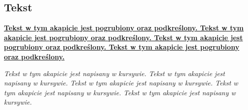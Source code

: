 \subsection{Tekst}
\par \textbf{\underline{Tekst w tym akapicie jest pogrubiony oraz podkreślony. Tekst w tym akapicie jest pogrubiony oraz podkreślony. Tekst w tym akapicie jest pogrubiony oraz podkreślony. Tekst w tym akapicie jest pogrubiony oraz podkreślony.}} \par \textit{Tekst w tym akapicie jest napisany w kursywie. Tekst w tym akapicie jest napisany w kursywie. Tekst w tym akapicie jest napisany w kursywie. Tekst w tym akapicie jest napisany w kursywie. Tekst w tym akapicie jest napisany w kursywie.} 
